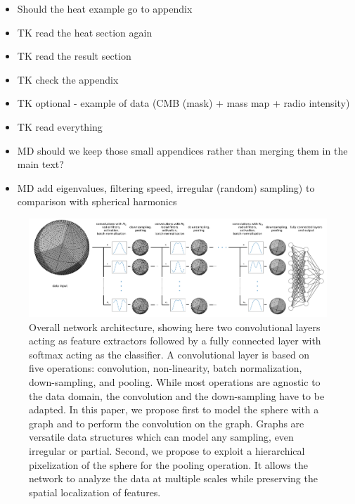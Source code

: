 \documentclass[final,twocolumn,3p,times,authoryear]{elsarticle}
\newcommand{\nati}[1]{{\color[rgb]{.1,.6,.1}{#1}}}
\newcommand{\1}{\b{1}}              %
\newcommand{\0}{\b{0}}              %
\begin{document}
\begin{itemize}[noitemsep,topsep=0pt,parsep=0pt,partopsep=0pt]
    \item Should the heat example go to appendix
    \item TK read the heat section again
    \item TK read the result section
    \item TK check the appendix
    \item TK optional - example of data (CMB (mask) + mass map + radio intensity)
    \item TK read everything
	\item MD should we keep those small appendices rather than merging them in the main text?
	\item MD add eigenvalues, filtering speed, irregular (random) sampling) to comparison with spherical harmonics
\end{itemize}

\begin{figure}[!ht]
	\centering
	\includegraphics[width=\linewidth]{figures/figure_architecture.pdf}
	\caption{Overall network architecture, showing here two convolutional layers acting as feature extractors followed by a fully connected layer with softmax acting as the classifier. A convolutional layer is based on five operations: convolution, non-linearity, batch normalization, down-sampling, and pooling. While most operations are agnostic to the data domain, the convolution and the down-sampling have to be adapted. In this paper, we propose first to model the sphere with a graph and to perform the convolution on the graph. Graphs are versatile data structures which can model any sampling, even irregular or partial. Second, we propose to exploit a hierarchical pixelization of the sphere for the pooling operation. It allows the network to analyze the data at multiple scales while preserving the spatial localization of features.
    \nati{Great plot! Could you make the sphere round? If you use the current code in paper plot notebook, they will be.}
    }
	\label{fig:architecture}
\end{figure}
\end{document}
